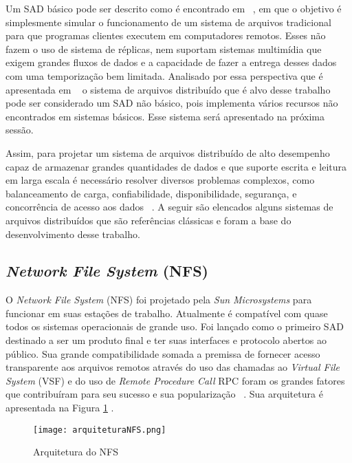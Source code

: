 	 Um SAD básico pode ser descrito como é encontrado em ~\cite{coulouris}, em que o objetivo é simplesmente simular o funcionamento de um sistema de arquivos tradicional para que programas clientes executem em computadores remotos. Esses não fazem o uso de sistema de réplicas, nem suportam sistemas multimídia que exigem grandes fluxos de dados e a capacidade de fazer a entrega desses dados com uma temporização bem limitada.
	 Analisado por essa perspectiva que é apresentada em ~\cite{coulouris} o sistema de arquivos distribuído que é alvo desse trabalho pode ser considerado um SAD não básico, pois implementa vários recursos não encontrados em sistemas básicos. Esse sistema será apresentado na próxima sessão.
	 
	 Assim, para projetar um sistema de arquivos distribuído de alto desempenho capaz de armazenar grandes quantidades de dados e que suporte escrita e leitura em larga escala é necessário resolver diversos problemas complexos, como balanceamento de carga, confiabilidade, disponibilidade, segurança, e concorrência de acesso aos dados ~\cite{coulouris}.
	 A seguir são elencados alguns sistemas de arquivos distribuídos que são referências clássicas e foram a base do desenvolvimento desse trabalho.
	
	 
	\subsection{\textit{Network File System} (NFS)}
	
	    O \textit{Network File System} (NFS) foi projetado pela \textit{Sun Microsystems} para funcionar em suas estações de trabalho. Atualmente é compatível com quase todos os sistemas operacionais de grande uso. Foi lançado como o primeiro SAD destinado a ser um produto final e ter suas interfaces e protocolo abertos ao público. Sua grande compatibilidade somada a premissa de fornecer acesso transparente aos arquivos remotos através do uso das chamadas ao \textit{Virtual File System} (VSF) e do uso de \textit{Remote Procedure Call} RPC foram os grandes fatores que contribuíram para seu sucesso e sua popularização ~\cite{coulouris}. Sua arquitetura é apresentada na Figura \ref{fig:arquiteturaNFS} .
	
    	\begin{figure}[h]
            \texttt{[image: arquiteturaNFS.png]}
            \caption{Arquitetura do NFS ~\cite{coulouris}}
            \label{fig:arquiteturaNFS}
        \end{figure}
    
